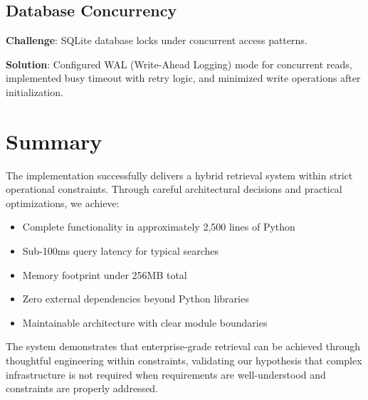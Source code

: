 \subsection{Database Concurrency}

\textbf{Challenge}: SQLite database locks under concurrent access patterns.

\textbf{Solution}: Configured WAL (Write-Ahead Logging) mode for concurrent reads, implemented busy timeout with retry logic, and minimized write operations after initialization.

\section{Summary}

The implementation successfully delivers a hybrid retrieval system within strict operational constraints. Through careful architectural decisions and practical optimizations, we achieve:

\begin{itemize}[leftmargin=*,itemsep=3pt,topsep=3pt]
  \item Complete functionality in approximately 2,500 lines of Python
  \item Sub-100ms query latency for typical searches
  \item Memory footprint under 256MB total
  \item Zero external dependencies beyond Python libraries
  \item Maintainable architecture with clear module boundaries
\end{itemize}

The system demonstrates that enterprise-grade retrieval can be achieved through thoughtful engineering within constraints, validating our hypothesis that complex infrastructure is not required when requirements are well-understood and constraints are properly addressed.
